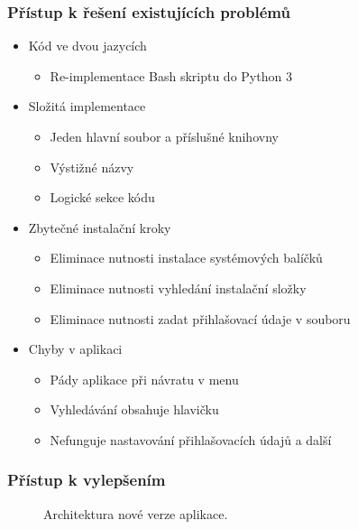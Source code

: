 \documentclass[%
  12pt,       				%
	t,                  %
	aspectratio=1610,   %
	unicode,						%
]{beamer}				    	%
\begin{document}
\begin{frame} 
\frametitle{Přístup k řešení existujících problémů}
\begin{itemize}
	\item Kód ve dvou jazycích
		\begin{itemize}
			\item Re-implementace Bash skriptu do Python 3
		\end{itemize}
	\item Složitá implementace
		\begin{itemize}
			\item Jeden hlavní soubor a příslušné knihovny
			\item Výstižné názvy
			\item Logické sekce kódu
		\end{itemize}
	\item Zbytečné instalační kroky
		\begin{itemize}
			\item Eliminace nutnosti instalace systémových balíčků
			\item Eliminace nutnosti vyhledání instalační složky
			\item Eliminace nutnosti zadat přihlašovací údaje v souboru
		\end{itemize}
	\item Chyby v aplikaci
		\begin{itemize}
			\item Pády aplikace při návratu v menu
			\item Vyhledávání obsahuje hlavičku
			\item Nefunguje nastavování přihlašovacích údajů a další
		\end{itemize}
\end{itemize}
\end{frame} 

\begin{frame} 
\frametitle{Přístup k vylepšením}
	\begin{figure}[H]
		\centering
		\caption{Architektura nové verze aplikace.}
		\label{fig:archdiagram}
	\end{figure}
\end{frame}
\end{document}
